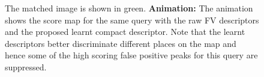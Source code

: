 \documentclass[10pt,onecolumn,A4]{article}
\begin{document}
\begin{figure}
{	The matched image is shown in green. 
	{\bf Animation:} The animation shows the score map for the same query with the raw FV descriptors and the proposed learnt compact descriptor. Note that the learnt descriptors better discriminate different places on the map and hence some of the high scoring false positive peaks for this query are suppressed.
}
%	
\end{figure}
\end{document}
